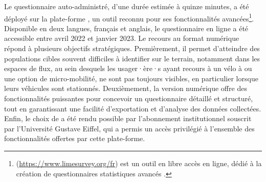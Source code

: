 \begin{refsegment}
Le questionnaire auto-administré, d’une durée estimée à quinze minutes, a été déployé sur la plate-forme , un outil reconnu pour ses fonctionnalités avancées\footnote{
     (\url{https://www.limesurvey.org/fr}) est un outil en libre accès en ligne, dédié à la création de questionnaires statistiques avancés \textcolor{blue}{\autocite{limesurvey_limesurvey_nodate}}.
}. Disponible en deux langues, français et anglais, le questionnaire en ligne a été accessible entre avril 2022 et janvier 2023. Le recours au format numérique répond à plusieurs objectifs stratégiques. Premièrement, il permet d’atteindre des populations cibles souvent difficiles à identifier sur le terrain, notamment dans les espaces de flux, au sein desquels les usager·ère·s ayant recours à un vélo à ou une option de micro-mobilité, ne sont pas toujours visibles, en particulier lorsque leurs véhicules sont stationnés. Deuxièmement, la version numérique offre des fonctionnalités puissantes pour concevoir un questionnaire détaillé et structuré, tout en garantissant une facilité d’exportation et d’analyse des données collectées. Enfin, le choix de  a été rendu possible par l’abonnement institutionnel souscrit par l’Université Gustave Eiffel, qui a permis un accès privilégié à l’ensemble des fonctionnalités offertes par cette plate-forme.%


\end{refsegment}
